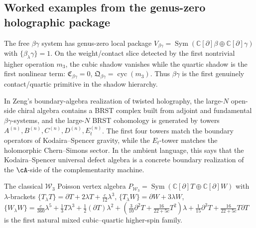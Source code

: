 \subsection{Worked examples from the genus-zero holographic package}
\label{subsec:holographic-worked-examples}

\begin{example}
\label{ex:betagamma-quartic-primitive}
The free $\beta\gamma$ system has genus-zero local package
$V_{\beta\gamma} = \operatorname{Sym}(\mathbb{C}[\partial]\beta
\oplus \mathbb{C}[\partial]\gamma)$ with
$\{\beta_\lambda\gamma\} = 1$. On the weight/contact slice
detected by the first nontrivial higher operation $m_3$, the cubic
shadow vanishes while the quartic shadow is the first nonlinear
term:
$\mathfrak{C}_{\beta\gamma} = 0$,
$\mathfrak{Q}_{\beta\gamma} = \operatorname{cyc}(m_3)$.
Thus $\beta\gamma$ is the first genuinely contact/quartic primitive
in the shadow hierarchy.
\end{example}

\begin{example}
\label{ex:kodaira-spencer-defect-algebra}
In Zeng's boundary-algebra realization of twisted holography, the
large-$N$ open-side chiral algebra contains a BRST complex built
from adjoint and fundamental $\beta\gamma$-systems, and the
large-$N$ BRST cohomology is generated by towers
$A^{(n)}, B^{(n)}, C^{(n)}, D^{(n)}, E_t^{(n)}$.
The first four towers match the boundary operators of
Kodaira--Spencer gravity, while the $E_t$-tower matches the
holomorphic Chern--Simons sector. In the ambient language, this
says that the Kodaira--Spencer universal defect algebra is a
concrete boundary realization of the $\cA$-side of the
complementarity machine.
\end{example}

\begin{example}
\label{ex:w3-first-mixed-higher-spin}
The classical $\mathcal{W}_3$ Poisson vertex algebra
$P_{\mathcal{W}_3} = \operatorname{Sym}(\mathbb{C}[\partial]T
\oplus \mathbb{C}[\partial]W)$ with $\lambda$-brackets
$\{T_\lambda T\} = \partial T + 2\lambda T
+ \frac{c}{12}\lambda^3$,
$\{T_\lambda W\} = \partial W + 3\lambda W$,
$\{W_\lambda W\} = \frac{c}{360}\lambda^5 + \frac13 T\lambda^3
+ \frac12(\partial T)\lambda^2
+ (\frac{3}{10}\partial^2 T + \frac{16}{22+5c}T^2)\lambda
+ \frac{1}{15}\partial^3 T + \frac{16}{22+5c}T\partial T$
is the first natural mixed cubic--quartic higher-spin family.
\end{example}

